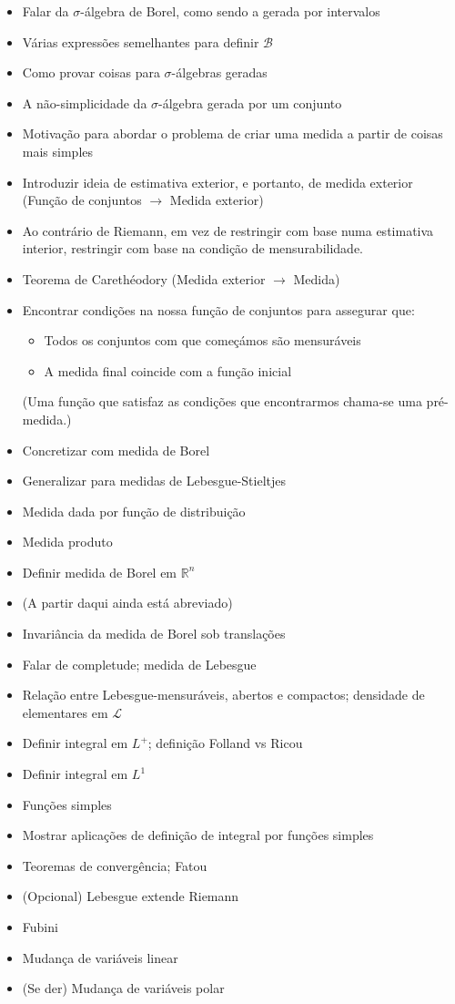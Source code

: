 \documentclass{article}
\newcommand{\R}{\mathbb{R}}
\begin{document}
\begin{itemize}
\item Falar da $\sigma$-álgebra de Borel, como sendo a gerada por intervalos
\item Várias expressões semelhantes para definir $\mathcal{B}$
\item Como provar coisas para $\sigma$-álgebras geradas
\item A não-simplicidade da $\sigma$-álgebra gerada por um conjunto
\item Motivação para abordar o problema de criar uma medida a partir de coisas mais simples
\item Introduzir ideia de estimativa exterior, e portanto, de medida exterior (Função de conjuntos $\to$ Medida exterior)
\item Ao contrário de Riemann, em vez de restringir com base numa estimativa interior, restringir com base na condição de mensurabilidade.
\item Teorema de Carethéodory (Medida exterior $\to$ Medida)
\item Encontrar condições na nossa função de conjuntos para assegurar que:
\begin{itemize}
\item Todos os conjuntos com que começámos são mensuráveis
\item A medida final coincide com a função inicial
\end{itemize}
(Uma função que satisfaz as condições que encontrarmos chama-se uma pré-medida.)
\item Concretizar com medida de Borel
\item Generalizar para medidas de Lebesgue-Stieltjes
\item Medida dada por função de distribuição
\item Medida produto
\item Definir medida de Borel em $\R^n$

\item (A partir daqui ainda está abreviado)

\item Invariância da medida de Borel sob translações
\item Falar de completude; medida de Lebesgue
\item Relação entre Lebesgue-mensuráveis, abertos e compactos; densidade de elementares em $\mathcal{L}$

\item Definir integral em $L^+$; definição Folland vs Ricou
\item Definir integral em $L^1$
\item Funções simples
\item Mostrar aplicações de definição de integral por funções simples
\item Teoremas de convergência; Fatou
\item (Opcional) Lebesgue extende Riemann
\item Fubini
\item Mudança de variáveis linear

\item (Se der) Mudança de variáveis polar
\end{itemize}
\end{document}
